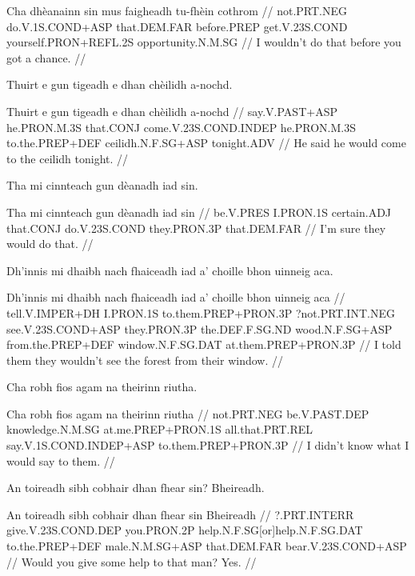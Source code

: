 \documentclass[a4paper,10pt]{article}
\begin{document}
\vspace{4mm}
\gla Cha dhèanainn sin mus faigheadh tu-fhèin cothrom  //
\glb not.PRT.NEG do.V.1S.COND+ASP that.DEM.FAR before.PREP get.V.23S.COND yourself.PRON+REFL.2S opportunity.N.M.SG  //
\glft I wouldn't do that before you got a chance. //
\endgl
\xe

\ex
\begingl
\glpre Thuirt e gun tigeadh e dhan chèilidh a-nochd. 

\vspace{4mm}
\gla Thuirt e gun tigeadh e dhan chèilidh a-nochd  //
\glb say.V.PAST+ASP he.PRON.M.3S that.CONJ come.V.23S.COND.INDEP he.PRON.M.3S to.the.PREP+DEF ceilidh.N.F.SG+ASP tonight.ADV  //
\glft He said he would come to the ceilidh tonight. //
\endgl
\xe

\ex
\begingl
\glpre Tha mi cinnteach gun dèanadh iad sin. 

\vspace{4mm}
\gla Tha mi cinnteach gun dèanadh iad sin  //
\glb be.V.PRES I.PRON.1S certain.ADJ that.CONJ do.V.23S.COND they.PRON.3P that.DEM.FAR  //
\glft I'm sure they would do that. //
\endgl
\xe

\ex
\begingl
\glpre Dh'innis mi dhaibh nach fhaiceadh iad a' choille bhon uinneig aca. 

\vspace{4mm}
\gla Dh'innis mi dhaibh nach fhaiceadh iad a' choille bhon uinneig aca  //
\glb tell.V.IMPER+DH I.PRON.1S to.them.PREP+PRON.3P ?not.PRT.INT.NEG see.V.23S.COND+ASP they.PRON.3P the.DEF.F.SG.ND wood.N.F.SG+ASP from.the.PREP+DEF window.N.F.SG.DAT at.them.PREP+PRON.3P  //
\glft I told them they wouldn't see the forest from their window. //
\endgl
\xe

\ex
\begingl
\glpre Cha robh fios agam na theirinn riutha. 

\vspace{4mm}
\gla Cha robh fios agam na theirinn riutha  //
\glb not.PRT.NEG be.V.PAST.DEP knowledge.N.M.SG at.me.PREP+PRON.1S all.that.PRT.REL say.V.1S.COND.INDEP+ASP to.them.PREP+PRON.3P  //
\glft I didn't know what I would say to them. //
\endgl
\xe

\ex
\begingl
\glpre An toireadh sibh cobhair dhan fhear sin? Bheireadh. 

\vspace{4mm}
\gla An toireadh sibh cobhair dhan fhear sin Bheireadh  //
\glb ?.PRT.INTERR give.V.23S.COND.DEP you.PRON.2P help.N.F.SG[or]help.N.F.SG.DAT to.the.PREP+DEF male.N.M.SG+ASP that.DEM.FAR bear.V.23S.COND+ASP  //
\glft Would you give some help to that man? Yes. //
\endgl
\xe
\end{document}
